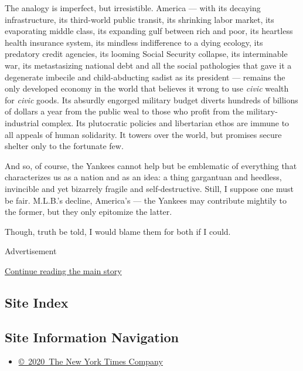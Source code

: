 The analogy is imperfect, but irresistible. America --- with its
decaying infrastructure, its third-world public transit, its shrinking
labor market, its evaporating middle class, its expanding gulf between
rich and poor, its heartless health insurance system, its mindless
indifference to a dying ecology, its predatory credit agencies, its
looming Social Security collapse, its interminable war, its
metastasizing national debt and all the social pathologies that gave it
a degenerate imbecile and child-abducting sadist as its president ---
remains the only developed economy in the world that believes it wrong
to use \emph{civic} wealth for \emph{civic} goods. Its absurdly engorged
military budget diverts hundreds of billions of dollars a year from the
public weal to those who profit from the military-industrial complex.
Its plutocratic policies and libertarian ethos are immune to all appeals
of human solidarity. It towers over the world, but promises secure
shelter only to the fortunate few.

And so, of course, the Yankees cannot help but be emblematic of
everything that characterizes us as a nation and as an idea: a thing
gargantuan and heedless, invincible and yet bizarrely fragile and
self-destructive. Still, I suppose one must be fair. M.L.B.'s decline,
America's --- the Yankees may contribute mightily to the former, but
they only epitomize the latter.

Though, truth be told, I would blame them for both if I could.

Advertisement

\protect\hyperlink{after-bottom}{Continue reading the main story}

\hypertarget{site-index}{%
\subsection{Site Index}\label{site-index}}

\hypertarget{site-information-navigation}{%
\subsection{Site Information
Navigation}\label{site-information-navigation}}

\begin{itemize}
\tightlist
\item
  \href{https://help.nytimes.com/hc/en-us/articles/115014792127-Copyright-notice}{©~2020~The
  New York Times Company}
\end{itemize}


